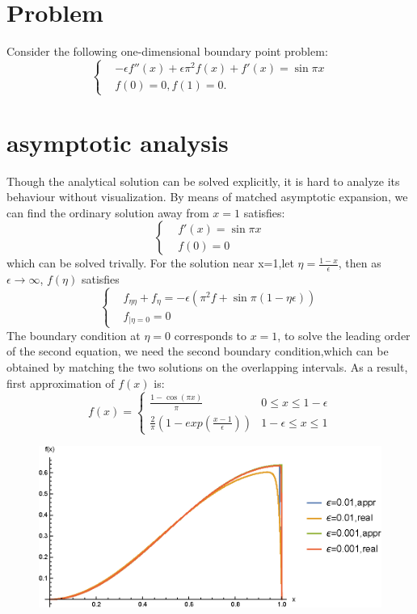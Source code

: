 \documentclass{article}
\begin{document}
\section{Problem}
Consider the following one-dimensional boundary point problem:
\begin{equation}\label{eq:2b}
\begin{cases}
&-\epsilon f''(x)+\epsilon \pi^2 f(x)+f'(x)=\sin \pi x\\
&f(0)=0,f(1)=0.
\end{cases}
\end{equation}
\section{asymptotic analysis}
Though the analytical solution can be solved explicitly, it is hard to analyze its behaviour without visualization.
By means of matched asymptotic expansion, we can find the ordinary solution away from $x=1$ satisfies:
\begin{equation}
\begin{cases}
&f'(x)=\sin \pi x\\
&f(0)=0
\end{cases}
\end{equation}
which can be solved trivally.
For the solution near x=1,let $\eta=\frac{1-x}{\epsilon}$, then
as $\epsilon \to \infty$, $f(\eta)$ satisfies 
\begin{equation}
\begin{cases}
&f_{\eta\eta}+f_{\eta}=-\epsilon(\pi^2 f+\sin \pi (1-\eta \epsilon))\\
&f_{|\eta=0}=0
\end{cases}
\end{equation}
The boundary condition at $\eta=0$ corresponds to $x=1$, to solve the leading order of the second equation, we need the second boundary condition,which can be obtained by matching the two solutions on the overlapping intervals.
As a result, first approximation of $f(x)$ is:
\begin{equation}
f(x)=\begin{cases}
\frac{1-\cos(\pi x)}{\pi}&0\leq x\leq 1-\epsilon\\
\frac{2}{\pi}(1-exp(\frac{x-1}{\epsilon}))&1-\epsilon\leq x\leq 1
\end{cases}
\end{equation}
\begin{figure}
\centering
\includegraphics[width=\textwidth]{appr.eps}
\end{figure}
\end{document}
